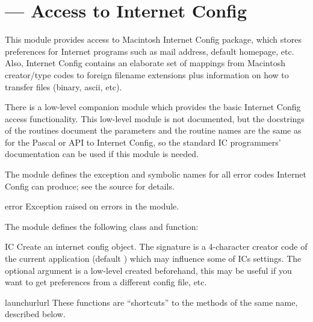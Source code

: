 \section{ ---
         Access to Internet Config}



This module provides access to Macintosh Internet Config package,
which stores preferences for Internet programs such as mail address,
default homepage, etc. Also, Internet Config contains an elaborate set
of mappings from Macintosh creator/type codes to foreign filename
extensions plus information on how to transfer files (binary, ascii,
etc).

There is a low-level companion module
 which provides the basic
Internet Config access functionality.  This low-level module is not
documented, but the docstrings of the routines document the parameters
and the routine names are the same as for the Pascal or \C{} API to
Internet Config, so the standard IC programmers' documentation can be
used if this module is needed.

The  module defines the  exception and
symbolic names for all error codes Internet Config can produce; see
the source for details.

\begin{excdesc}{error}
Exception raised on errors in the  module.
\end{excdesc}


The  module defines the following class and function:

\begin{classdesc}{IC}{}
Create an internet config object. The signature is a 4-character creator
code of the current application (default ) which may
influence some of ICs settings. The optional  argument is a
low-level  created beforehand, this may be
useful if you want to get preferences from a different config file,
etc.
\end{classdesc}

\begin{funcdesc}{launchurl}{url}
These functions are ``shortcuts'' to the methods of the same name,
described below.
\end{funcdesc}



